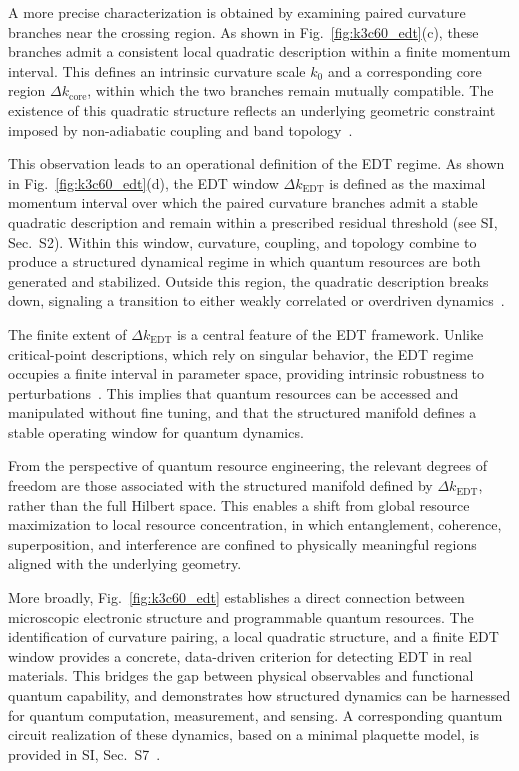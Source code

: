 \documentclass[twocolumn,10pt]{article}
\begin{document}
A more precise characterization is obtained by examining paired curvature branches near the crossing region. As shown in Fig.~\ref{fig:k3c60_edt}(c), these branches admit a consistent local quadratic description within a finite momentum interval. This defines an intrinsic curvature scale $k_0$ and a corresponding core region $\Delta k_{\mathrm{core}}$, within which the two branches remain mutually compatible. The existence of this quadratic structure reflects an underlying geometric constraint imposed by non-adiabatic coupling and band topology~\cite{Berry1984,Xiao2010}.

This observation leads to an operational definition of the EDT regime. As shown in Fig.~\ref{fig:k3c60_edt}(d), the EDT window $\Delta k_{\mathrm{EDT}}$ is defined as the maximal momentum interval over which the paired curvature branches admit a stable quadratic description and remain within a prescribed residual threshold (see SI, Sec.~S2). Within this window, curvature, coupling, and topology combine to produce a structured dynamical regime in which quantum resources are both generated and stabilized. Outside this region, the quadratic description breaks down, signaling a transition to either weakly correlated or overdriven dynamics~\cite{Larkin1969,Swingle2018}.

The finite extent of $\Delta k_{\mathrm{EDT}}$ is a central feature of the EDT framework. Unlike critical-point descriptions, which rely on singular behavior, the EDT regime occupies a finite interval in parameter space, providing intrinsic robustness to perturbations~\cite{Altman2015}. This implies that quantum resources can be accessed and manipulated without fine tuning, and that the structured manifold defines a stable operating window for quantum dynamics.

From the perspective of quantum resource engineering, the relevant degrees of freedom are those associated with the structured manifold defined by $\Delta k_{\mathrm{EDT}}$, rather than the full Hilbert space. This enables a shift from global resource maximization to local resource concentration, in which entanglement, coherence, superposition, and interference are confined to physically meaningful regions aligned with the underlying geometry.

More broadly, Fig.~\ref{fig:k3c60_edt} establishes a direct connection between microscopic electronic structure and programmable quantum resources. The identification of curvature pairing, a local quadratic structure, and a finite EDT window provides a concrete, data-driven criterion for detecting EDT in real materials. This bridges the gap between physical observables and functional quantum capability, and demonstrates how structured dynamics can be harnessed for quantum computation, measurement, and sensing. A corresponding quantum circuit realization of these dynamics, based on a minimal plaquette model, is provided in SI, Sec.~S7~\cite{Lloyd1996,Childs2019}.
\end{document}
